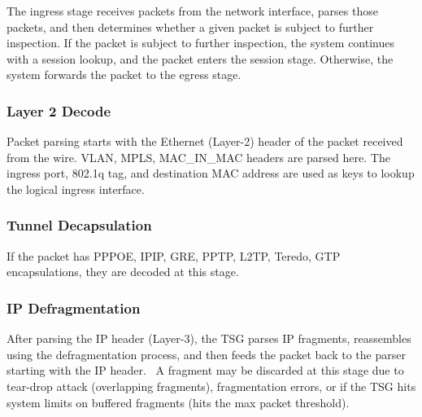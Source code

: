 The ingress stage receives packets from the network interface, parses those packets, and then determines whether a given packet is subject to further inspection. 
If the packet is subject to further inspection, the system continues with a session lookup, and the packet enters the session stage. 
Otherwise, the system forwards the packet to the egress stage.

\subsubsection*{\hypertarget{link:Layer 2 Decode}{Layer 2 Decode}}
\label{sec:appendix_e:sequence:ingress:decode}

Packet parsing starts with the Ethernet (Layer-2) header of the packet received from the wire. VLAN, MPLS, MAC\_IN\_MAC headers are parsed here. 
The ingress port, 802.1q tag, and destination MAC address are used as keys to lookup the logical ingress interface. 

\subsubsection*{\hypertarget{link:Tunnel Decapsulation}{Tunnel Decapsulation}}
\label{sec:appendix_e:sequence:ingress:decapsulation}

If the packet has PPPOE, IPIP, GRE, PPTP, L2TP, Teredo, GTP encapsulations, they are decoded at this stage.

\subsubsection*{\hypertarget{link:IP Defragmentation}{IP Defragmentation}}
\label{sec:appendix_e:sequence:ingress:defragmentation}

After parsing the IP header (Layer-3), the TSG parses IP fragments, reassembles using the defragmentation process, and then feeds the packet back to the parser starting with the IP header.  
A fragment may be discarded at this stage due to tear-drop attack (overlapping fragments), fragmentation errors, or if the TSG hits system limits on buffered fragments 
(hits the max packet threshold).

